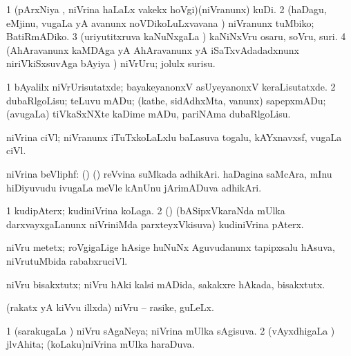 {\noindent 
\gl{\akirx}
\expl{}
\bmng
\bnum
\num{1} (pArxNiya \vi, niVrina haLaLx \mo vakekx hoVgi)(niVranunx) kuDi. 
\num{2} (haDagu, eMjinu, \mo vugaLa yA avanunx noVDikoLuLxvavana \vi) niVranunx tuMbiko; BatiRmADiko. 
\num{3} (uriyutitxruva kaNuNxgaLa \vi) kaNiNxVru osaru, soVru, suri. 
\num{4} (AhAravanunx kaMDAga yA AhAravanunx yA iSaTxvAdadadxnunx niriVkiSxsuvAga bAyiya \vi) niVrUru; jolulx surisu. 
\enum
\emng

\noindent 
\gl{\pagu}
\expl{}
\bmng
\bnum
\num{1}  bAyalilx niVrUrisutatxde; bayakeyanonxV asUyeyanonxV keraLisutatxde. 
\num{2}  dubaRlgoLisu; teLuvu mADu; (kathe, sidAdhxMta, \mo vanunx) sapepxmADu; (avugaLa) tiVkaSxNXte kaDime mADu, pariNAma dubaRlgoLisu. 
\enum
\emng
\eentry

\bentry
{} 
\gl{\nA}
\expl{}
\bmng
niVrina ciVl; niVranunx iTuTxkoLaLxlu baLasuva togalu, kAYxnavxsf, \mo vugaLa ciVl. 
\emng
\eentry

\bentry
{} 
\gl{\nA}
\expl{}
\bmng
niVrina beVliphf: 
\banum
{} (\birx) (\ca) reVvina suMkada adhikAri. 
 haDagina saMcAra, mInu hiDiyuvudu ivugaLa meVle kAnUnu jArimADuva adhikAri. 
\eanum
\emng
\eentry

\bentry
{} 
\gl{\nA}
\expl{}
\bmng
\bnum
\num{1} kudipAterx; kudiniVrina koLaga. 
\num{2} (\ravi) (bASipxVkaraNda mUlka darxvayxgaLanunx niVriniMda parxteyxVkisuva) kudiniVrina pAterx. 
\enum
\emng
\eentry

\bentry
{} 
\gl{\nA}
\expl{}
\bmng
{} 
\emng
\eentry

\bentry
{} 
\gl{\nA}
\expl{}
\bmng
{} 
\emng
\eentry

\bentry 
{} 
\gl{\nA}
\expl{}
\bmng
niVru metetx; roVgigaLige hAsige huNuNx Aguvudanunx tapipxsalu hAsuva, niVrutuMbida rababxruciVl. 
\emng
\eentry

\bentry
{} 
\gl{\nA}
\expl{}
\bmng
niVru bisakxtutx; niVru hAki kalsi mADida, sakakxre hAkada, bisakxtutx. 
\emng
\eentry

\bentry
{} 
\gl{\nA}
\expl{}
\bmng
(rakatx yA kiVvu illxda) niVru -- rasike, guLeLx. 
\emng
\eentry

\bentry
{} 
\gl{\gu}
\expl{}
\bmng
\bnum
\num{1} (sarakugaLa \vi) niVru sAgaNeya; niVrina mUlka sAgisuva. 
\num{2} (vAyxdhigaLa \vi) jlvAhita; (koLaku)niVrina mUlka haraDuva. 
\enum
\emng
\eentry

}
